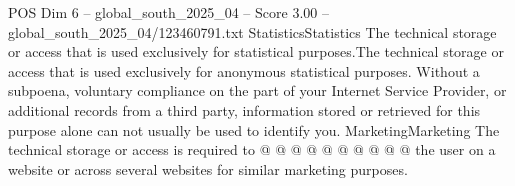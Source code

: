 \begin{textsample}{POS Dim 6 – global\_south\_2025\_04 – Score 3.00 – global\_south\_2025\_04/123460791.txt}
StatisticsStatistics The technical storage or access that is used exclusively for statistical purposes.The technical storage or access that is used exclusively for anonymous statistical purposes.
Without a subpoena, voluntary compliance on the part of your Internet Service Provider, or additional records from a third party, information stored or retrieved for this purpose alone can not usually be used to identify you.
MarketingMarketing The technical storage or access is required to @ @ @ @ @ @ @ @ @ @ the user on a website or across several websites for similar marketing purposes.

\end{textsample}
